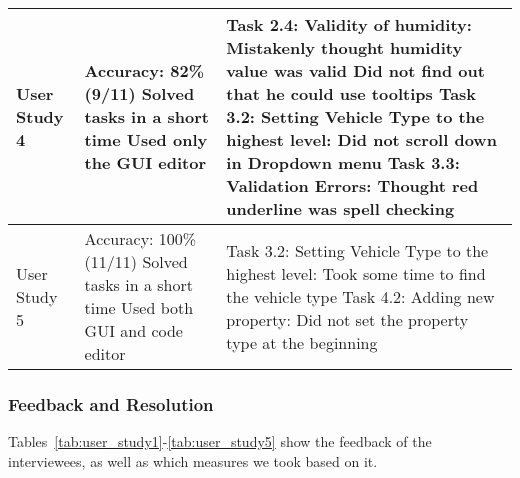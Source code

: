 \begin{table*}[!htbp]
\begin{tabular}{lp{4.5cm}p{6cm}}
        User Study 4 &
            Accuracy: 82\%(9/11)\newline
            Solved tasks in a short time\newline
            Used only the GUI editor

            &

            Task 2.4: Validity of humidity:\newline
            Mistakenly thought humidity value was valid\newline
            Did not find out that he could use tooltips\newline
            Task 3.2: Setting Vehicle Type to the highest level: \newline
            Did not scroll down in Dropdown menu\newline
            Task 3.3: Validation Errors:\newline
            Thought red underline was spell checking \\ \midrule

        User Study 5 &
            Accuracy: 100\%(11/11)\newline
            Solved tasks in a short time\newline
            Used both GUI and code editor

            &

            Task 3.2: Setting Vehicle Type to the highest level: \newline
            Took some time to find the vehicle type \newline
            Task 4.2: Adding new property:\newline
        Did not set the property type at the beginning \\ \bottomrule
    \end{tabular}
\end{table*}

\subsubsection{Feedback and Resolution} %
Tables~\ref{tab:user_study1}-\ref{tab:user_study5} show the feedback of the interviewees, as well as which measures we took based on it.

